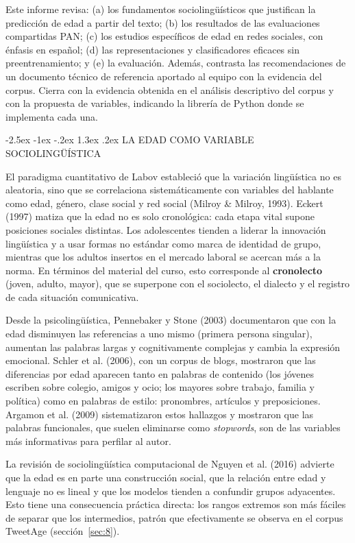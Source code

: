 \documentclass[10pt,twocolumn]{article}
\makeatletter
\renewcommand{\section}{\@startsection{section}{1}{\z@}%
  {-2.5ex \@plus -1ex \@minus -.2ex}%
  {1.3ex \@plus .2ex}%
  {\normalfont\large\bfseries\centering}}
\makeatother
\begin{document}
Este informe revisa: (a) los fundamentos sociolingüísticos que justifican la predicción de edad a partir del texto; (b) los resultados de las evaluaciones compartidas PAN; (c) los estudios específicos de edad en redes sociales, con énfasis en español; (d) las representaciones y clasificadores eficaces sin preentrenamiento; y (e) la evaluación. Además, contrasta las recomendaciones de un documento técnico de referencia aportado al equipo con la evidencia del corpus. Cierra con la evidencia obtenida en el análisis descriptivo del corpus y con la propuesta de variables, indicando la librería de Python donde se implementa cada una.


\section{LA EDAD COMO VARIABLE SOCIOLINGÜÍSTICA}\label{sec:2}

El paradigma cuantitativo de Labov estableció que la variación lingüística no es aleatoria, sino que se correlaciona sistemáticamente con variables del hablante como edad, género, clase social y red social (Milroy \& Milroy, 1993). Eckert (1997) matiza que la edad no es solo cronológica: cada etapa vital supone posiciones sociales distintas. Los adolescentes tienden a liderar la innovación lingüística y a usar formas no estándar como marca de identidad de grupo, mientras que los adultos insertos en el mercado laboral se acercan más a la norma. En términos del material del curso, esto corresponde al \textbf{cronolecto} (joven, adulto, mayor), que se superpone con el sociolecto, el dialecto y el registro de cada situación comunicativa.

Desde la psicolingüística, Pennebaker y Stone (2003) documentaron que con la edad disminuyen las referencias a uno mismo (primera persona singular), aumentan las palabras largas y cognitivamente complejas y cambia la expresión emocional. Schler et al. (2006), con un corpus de blogs, mostraron que las diferencias por edad aparecen tanto en palabras de contenido (los jóvenes escriben sobre colegio, amigos y ocio; los mayores sobre trabajo, familia y política) como en palabras de estilo: pronombres, artículos y preposiciones. Argamon et al. (2009) sistematizaron estos hallazgos y mostraron que las palabras funcionales, que suelen eliminarse como \textit{stopwords}, son de las variables más informativas para perfilar al autor.

La revisión de sociolingüística computacional de Nguyen et al. (2016) advierte que la edad es en parte una construcción social, que la relación entre edad y lenguaje no es lineal y que los modelos tienden a confundir grupos adyacentes. Esto tiene una consecuencia práctica directa: los rangos extremos son más fáciles de separar que los intermedios, patrón que efectivamente se observa en el corpus TweetAge (sección~\ref{sec:8}).
\end{document}
